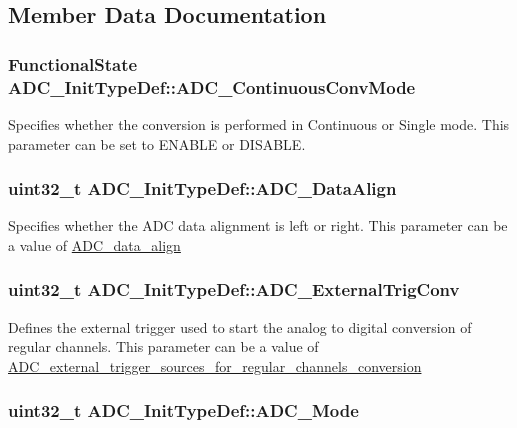 \subsection{Member Data Documentation}
\hypertarget{structADC__InitTypeDef_a2149036a332281e70a36879a2396b8d1}{
\subsubsection[{ADC\_\-ContinuousConvMode}]{\setlength{\rightskip}{0pt plus 5cm}FunctionalState {\bf ADC\_\-InitTypeDef::ADC\_\-ContinuousConvMode}}}
\label{structADC__InitTypeDef_a2149036a332281e70a36879a2396b8d1}
Specifies whether the conversion is performed in Continuous or Single mode. This parameter can be set to ENABLE or DISABLE. \hypertarget{structADC__InitTypeDef_a622e89d8fba3900f20aaf40d5560ab7b}{
\subsubsection[{ADC\_\-DataAlign}]{\setlength{\rightskip}{0pt plus 5cm}uint32\_\-t {\bf ADC\_\-InitTypeDef::ADC\_\-DataAlign}}}
\label{structADC__InitTypeDef_a622e89d8fba3900f20aaf40d5560ab7b}
Specifies whether the ADC data alignment is left or right. This parameter can be a value of \hyperlink{group__ADC__data__align}{ADC\_\-data\_\-align} \hypertarget{structADC__InitTypeDef_ae5d0c48e70c2a39355b7ab0cc1df8310}{
\subsubsection[{ADC\_\-ExternalTrigConv}]{\setlength{\rightskip}{0pt plus 5cm}uint32\_\-t {\bf ADC\_\-InitTypeDef::ADC\_\-ExternalTrigConv}}}
\label{structADC__InitTypeDef_ae5d0c48e70c2a39355b7ab0cc1df8310}
Defines the external trigger used to start the analog to digital conversion of regular channels. This parameter can be a value of \hyperlink{group__ADC__external__trigger__sources__for__regular__channels__conversion}{ADC\_\-external\_\-trigger\_\-sources\_\-for\_\-regular\_\-channels\_\-conversion} \hypertarget{structADC__InitTypeDef_a0f9ec17ad585d66a54625213062c9260}{
\subsubsection[{ADC\_\-Mode}]{\setlength{\rightskip}{0pt plus 5cm}uint32\_\-t {\bf ADC\_\-InitTypeDef::ADC\_\-Mode}}}
